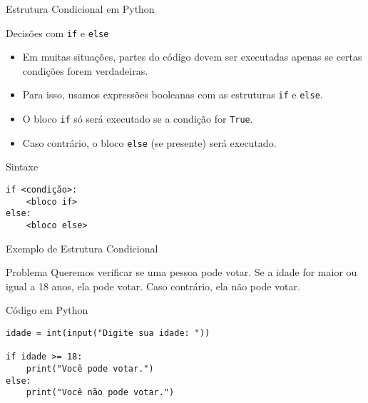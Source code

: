\begin{frame}[fragile]{Estrutura Condicional em Python}

    \begin{block}{Decisões com \texttt{if} e \texttt{else}}
        \begin{itemize}
            \item Em muitas situações, partes do código devem ser executadas apenas se certas condições forem verdadeiras.
            \item Para isso, usamos expressões booleanas com as estruturas \texttt{if} e \texttt{else}.
            \item O bloco \texttt{if} só será executado se a condição for \texttt{True}.
            \item Caso contrário, o bloco \texttt{else} (se presente) será executado.
        \end{itemize}
    \end{block}

    \vspace{0.5em}

    \begin{block}{Sintaxe}
        \begin{verbatim}
if <condição>:
    <bloco if>
else:
    <bloco else>
\end{verbatim}
    \end{block}

\end{frame}

\begin{frame}[fragile]{Exemplo de Estrutura Condicional}

    \begin{block}{Problema}
        Queremos verificar se uma pessoa pode votar.
        Se a idade for maior ou igual a 18 anos, ela pode votar.
        Caso contrário, ela não pode votar.
    \end{block}

    \vspace{1em}

    \begin{block}{Código em Python}
        \begin{verbatim}
idade = int(input("Digite sua idade: "))

if idade >= 18:
    print("Você pode votar.")
else:
    print("Você não pode votar.")
\end{verbatim}
    \end{block}

\end{frame}

